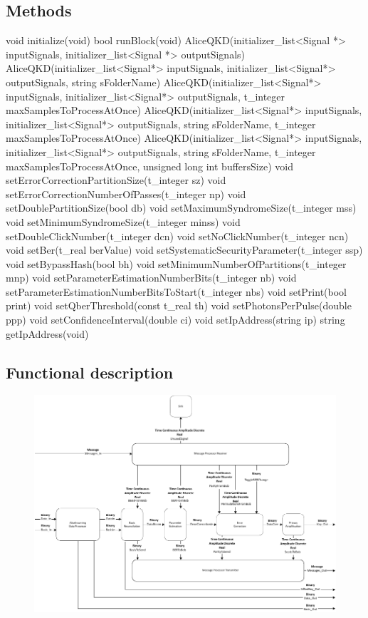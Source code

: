 \subsection*{Methods}
void initialize(void)
\bigbreak
bool runBlock(void)
\bigbreak
AliceQKD(initializer\_list<Signal *> inputSignals, initializer\_list<Signal *> outputSignals)
\bigbreak
AliceQKD(initializer\_list<Signal*> inputSignals, initializer\_list<Signal*> outputSignals, string sFolderName)
\bigbreak
AliceQKD(initializer\_list<Signal*> inputSignals, initializer\_list<Signal*> outputSignals, t\_integer maxSamplesToProcessAtOnce)
\bigbreak
AliceQKD(initializer\_list<Signal*> inputSignals, initializer\_list<Signal*> outputSignals, string sFolderName, t\_integer maxSamplesToProcessAtOnce)
\bigbreak
AliceQKD(initializer\_list<Signal*> inputSignals, initializer\_list<Signal*> outputSignals, string sFolderName, t\_integer maxSamplesToProcessAtOnce, unsigned long int buffersSize)
\bigbreak
void setErrorCorrectionPartitionSize(t\_integer sz)
\bigbreak
void setErrorCorrectionNumberOfPasses(t\_integer np)
\bigbreak
void setDoublePartitionSize(bool db)
\bigbreak
void setMaximumSyndromeSize(t\_integer mss)
\bigbreak
void setMinimumSyndromeSize(t\_integer minss)
\bigbreak
void setDoubleClickNumber(t\_integer dcn)
\bigbreak
void setNoClickNumber(t\_integer ncn)
\bigbreak
void setBer(t\_real berValue)
\bigbreak
void setSystematicSecurityParameter(t\_integer ssp)
\bigbreak
void setBypassHash(bool bh)
\bigbreak
void setMinimumNumberOfPartitions(t\_integer mnp)
\bigbreak
void setParameterEstimationNumberBits(t\_integer nb)
\bigbreak
void setParameterEstimationNumberBitsToStart(t\_integer nbs)
\bigbreak
void setPrint(bool print)
\bigbreak
void setQberThreshold(const t\_real th)
\bigbreak
void setPhotonsPerPulse(double ppp)
\bigbreak
void setConfidenceInterval(double ci)
\bigbreak
void setIpAddress(string ip)
\bigbreak
string getIpAddress(void)


\subsection*{Functional description}

\begin{figure}[H]
	\centering
	\includegraphics{./lib/alice_qkd2/figures/AliceQKD_blockDiagram.pdf}
\end{figure}

